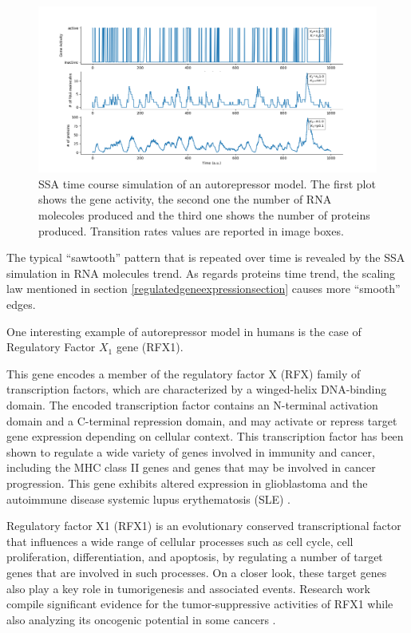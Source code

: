 \documentclass[12pt,a4paper]{report}
\begin{document}
\begin{figure}[!ht]
\hspace*{-2.5cm} 
\includegraphics[scale=0.59]{autorepressortimeplotaugeneactivity.png}
\caption{SSA time course simulation of an autorepressor model. The first plot shows the gene activity, the second one the number of RNA molecoles produced and the third one shows the number of proteins produced. Transition rates values are reported in image boxes.}
\label{autorepressortimeplot}
\end{figure}
\newpage
The typical ``sawtooth'' pattern that is repeated over time is revealed by the SSA simulation in RNA molecules trend. As regards proteins time trend, the scaling law mentioned in section \ref{regulatedgeneexpressionsection} causes more ``smooth'' edges. 

One interesting example of autorepressor model in humans is the case of Regulatory Factor $X_{1}$ gene (RFX1).

This gene encodes a member of the regulatory factor X (RFX) family of transcription factors, which are characterized by a winged-helix DNA-binding domain. The encoded transcription factor contains an N-terminal activation domain and a C-terminal repression domain, and may activate or repress target gene expression depending on cellular context. This transcription factor has been shown to regulate a wide variety of genes involved in immunity and cancer, including the MHC class II genes and genes that may be involved in cancer progression. This gene exhibits altered expression in glioblastoma and the autoimmune disease systemic lupus erythematosis (SLE) \cite{RFX1Gene}.

Regulatory factor X1 (RFX1) is an evolutionary conserved transcriptional factor that influences a wide range of cellular processes such as cell cycle, cell proliferation, differentiation, and apoptosis, by regulating a number of target genes that are involved in such processes. On a closer look, these target genes also play a key role in tumorigenesis and associated events. Research work compile significant evidence for the tumor-suppressive activities of RFX1 while also analyzing its oncogenic potential in some cancers \cite{RFX1ArsenalAgainstCancer}.
\end{document}
